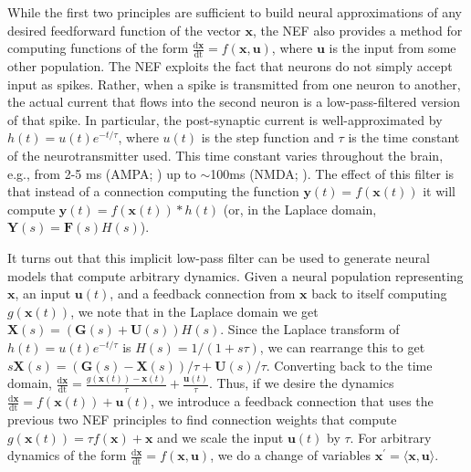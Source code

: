 \documentclass[english]{article}
\begin{document}
While the first two principles are sufficient to build neural approximations
of any desired feedforward function of the vector $\mathbf{x}$, the NEF also
provides a method for computing functions of the form \textbf{$\mathbf{\frac{\mathrm{d}x}{\mathrm{dt}}=}f(\mathbf{x},\mathbf{u})$},
where $\mathbf{u}$ is the input from some other population. The NEF exploits the fact that neurons do not simply accept input
as spikes. Rather, when a spike is transmitted from one neuron to
another, the actual current that flows into the second neuron is a
low-pass-filtered version of that spike. In particular, the post-synaptic
current is well-approximated by $h(t)=u(t)e^{-t/\tau}$, where $u(t)$
is the step function and $\tau$ is the time constant of the neurotransmitter
used. This time constant varies throughout the brain, e.g., from 2-5
ms (AMPA; \cite{jonas1993quantal}) up to $\sim$100ms (NMDA;
\cite{sah1990properties}). The effect of this filter is that instead
of a connection computing the function $\mathbf{y}(t)=f(\mathbf{x}(t))$
it will compute $\mathbf{y}(t)=f(\mathbf{x}(t))*h(t)$ (or, in the
Laplace domain, $\mathbf{Y}(s)=\mathbf{F}(s)H(s)$).

It turns out that this implicit low-pass filter can be used to generate
neural models that compute arbitrary dynamics. Given a neural population
representing $\mathbf{x}$, an input $\mathbf{u}(t)$, and a feedback
connection from $\mathbf{x}$ back to itself computing $g(\mathbf{x}(t))$,
we note that in the Laplace domain we get $\mathbf{X}(s)=(\mathbf{G}(s)+\mathbf{U}(s))H(s)$.
Since the Laplace transform of $h(t)=u(t)e^{-t/\tau}$ is $H(s)=1/(1+s\tau)$,
we can rearrange this to get $s\mathbf{X}(s)=(\mathbf{G}(s)-\mathbf{X}(s))/\tau+\mathbf{U}(s)/\tau$.
Converting back to the time domain, \textbf{$\mathbf{\frac{\mathrm{d}x}{\mathrm{dt}}=}\frac{g(\mathbf{x}(t))-\mathbf{x}(t)}{\tau}+\frac{\mathbf{u}(t)}{\tau}$}.
Thus, if we desire the dynamics \textbf{$\mathbf{\frac{\mathrm{d}x}{\mathrm{dt}}=}f(\mathbf{x}(t))+\mathbf{u}(t)$},
we introduce a feedback connection that uses the previous two NEF
principles to find connection weights that compute $g(\mathbf{x}(t))=\tau f(\mathbf{x})+\mathbf{x}$
and we scale the input $\mathbf{u}(t)$ by $\tau$. For arbitrary
dynamics of the form \textbf{$\mathbf{\frac{\mathrm{d}x}{\mathrm{dt}}=}f(\mathbf{x},\mathbf{u})$},
we do a change of variables $\mathbf{x}^{\prime}=\langle\mathbf{x},\mathbf{u}\rangle$. 

\end{document}
